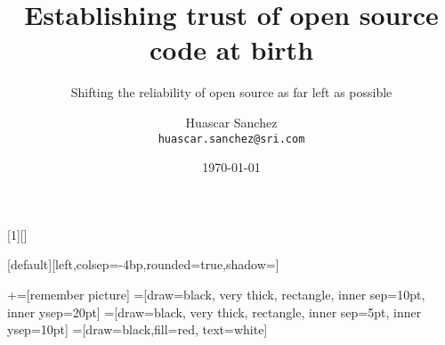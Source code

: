 

\usepackage{framed}
\usepackage[inline]{enumitem}
\usepackage[backend=bibtex]{biblatex}
\usepackage{amssymb}
\usepackage{amsmath}
\usepackage{gensymb}  %
\usepackage{dirtytalk} %

\newcommand{\norm}[1]{\left\lVert#1\right\rVert}

\usepackage{multirow}
\usepackage{booktabs}
\usepackage{tikzsymbols}

\usepackage{listings}


[1][]
{\lstset{language=Java}}{}

\usepackage{tikz}
\newcommand*{\shade}[2]{%
  \tikz[baseline=(X.base)] \node[rectangle, fill=#1, inner sep=0.5mm] (X) {\textnormal{#2}};%
}


\usepackage{mathtools}
\providecommand\given{}
\DeclarePairedDelimiterXPP\Aver[1]{\mathbb{E}}{\[}{\]}{}{
\renewcommand\given{  \nonscript\:
  \delimsize\vert\nonscript\:
  \mathopen{}
  \allowbreak}
#1
}


\title{Establishing trust of open source code at birth}
\subtitle{Shifting the reliability of open source as far left as possible}
\author{
\parbox[t]{1.5in}{Huascar Sanchez \\{\scriptsize\texttt{huascar.sanchez@sri.com}}} %
}

\date{\today}

\makeatletter
{}[default][left,colsep=-4bp,rounded=true,shadow=\beamer@themerounded@shadow]
\makeatother


\newcommand\marktopleft[1]{%
    \tikz[overlay,remember picture]
        \node(marker-#1-a) at (-.3em,.3em) {};%
}
\newcommand\markbottomright[2]{%
    \tikz[overlay,remember picture]
        \node(marker-#1-b) at (0em,0em) {};%
}
+=[remember picture]
 =[draw=black, very thick, rectangle, inner sep=10pt, inner ysep=20pt]
 =[draw=black, very thick, rectangle, inner sep=5pt, inner ysep=10pt]
 =[draw=black,fill=red, text=white]

